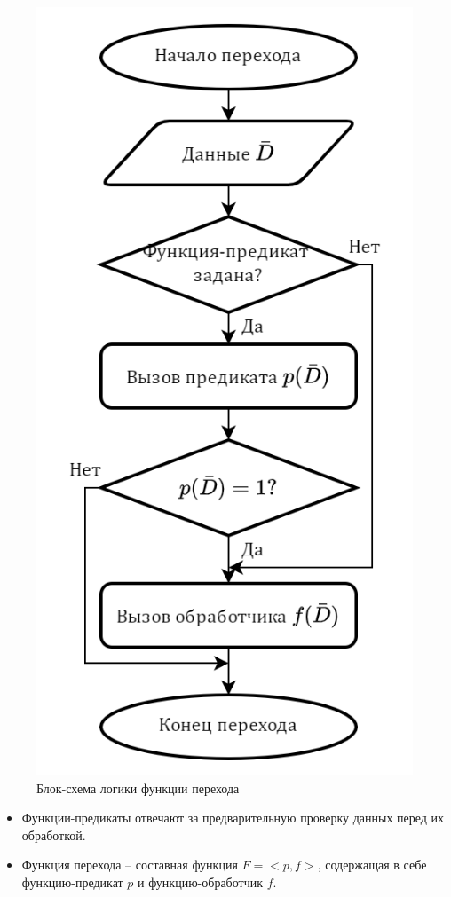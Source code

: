 \begin{frame}
\begin{figure}
\begin{minipage}{0.49\textwidth}
			\includegraphics[height=0.5\textheight]{images/flowchart.Transfer.png}
			\caption{Блок-схема логики функции перехода}
		\end{minipage}\hfill
	\end{figure}

	\begin{itemize}
		\item Функции-предикаты отвечают за предварительную проверку данных перед их обработкой.
		\item Функция перехода -- составная функция $F=<p,f>$, содержащая в себе функцию-предикат $p$ и функцию-обработчик $f$.
	\end{itemize}
\end{frame}

